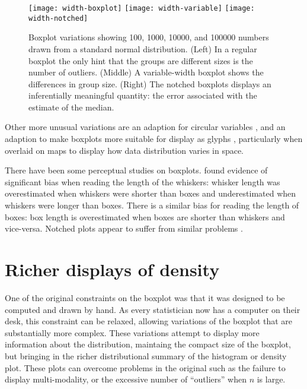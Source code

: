 \documentclass[oneside]{article}
\begin{document}
\begin{figure}[htbp]
  \centering
  \texttt{[image: width-boxplot]}%
  \texttt{[image: width-variable]}%
  \texttt{[image: width-notched]}
  \caption{Boxplot variations showing 100, 1000, 10000, and 100000 numbers drawn from a standard normal distribution.  (Left) In a regular boxplot the only hint that the groups are different sizes is the number of outliers. (Middle) A variable-width boxplot shows the differences in group size.  (Right) The notched boxplots displays an inferentially meaningful quantity: the error associated with the estimate of the median.}
  \label{fig:width}
\end{figure}

Other more unusual variations are an adaption for circular variables \citep{abuzaid:2011}, and an adaption to make boxplots more suitable for display as glyphs \citet{carr:1998}, particularly when overlaid on maps to display how data distribution varies in space.

There have been some perceptual studies on boxplots. \citet{behrens:1990} found evidence of significant bias when reading the length of the whiskers: whisker length was overestimated when whiskers were shorter than boxes and underestimated when whiskers were longer than boxes. There is a similar bias for reading the length of boxes: box length is overestimated when boxes are shorter than whiskers and vice-versa. Notched plots appear to suffer from similar problems \citep{wells:1996}.

\section{Richer displays of density}
\label{sec:density}

One of the original constraints on the boxplot was that it was designed to be computed and drawn by hand. As every statistician now has a computer on their desk, this constraint can be relaxed, allowing variations of the boxplot that are substantially more complex. These variations attempt to display more information about the distribution, maintaing the compact size of the boxplot, but bringing in the richer distributional summary of the histogram or density plot. These plots can overcome problems in the original such as the failure to display multi-modality, or the excessive number of ``outliers'' when $n$ is large.
\end{document}

